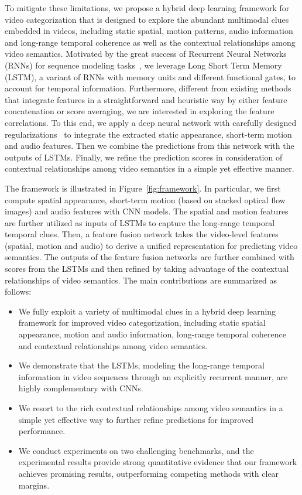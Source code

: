\documentclass[journal]{IEEEtran}
\begin{document}
To mitigate these limitations, we propose a hybrid deep learning framework for video categorization that is designed to explore the abundant multimodal clues embedded in videos, including static spatial, motion patterns, audio information and long-range temporal coherence as well as the contextual relationships among video semantics. Motivated by the great success of Recurrent Neural Networks (RNNs) for sequence modeling tasks~\cite{DBLP:conf/icassp/GravesMH13,graves2005framewise}, we leverage Long Short Term Memory (LSTM), a variant of RNNs with memory units and different functional gates, to account for temporal information. Furthermore, different from existing methods that integrate features in a straightforward and heuristic way by either feature concatenation or score averaging, we are interested in exploring the feature correlations. To this end, we apply a deep neural network with carefully designed regularizations~\cite{TPAMI-fcvid} to integrate the extracted static appearance, short-term motion and audio features. Then we combine the predictions from this network with the outputs of LSTMs. Finally, we refine the prediction scores in consideration of contextual relationships among video semantics in a simple yet effective manner.


The framework is illustrated in Figure~\ref{fig:framework}. In particular, we first compute spatial appearance, short-term motion (based on stacked optical flow images) and audio features with CNN models. The spatial and motion features are further utilized as inputs of LSTMs to capture the long-range temporal temporal clues. Then, a feature fusion network takes the video-level features (spatial, motion and audio) to derive a unified representation for predicting video semantics. The outputs of the feature fusion networks are further combined with scores from the LSTMs and then refined by taking advantage of the contextual relationships of video semantics. The main contributions are summarized as follows:



\begin{itemize}
\item We fully exploit a variety of multimodal clues in a hybrid deep learning framework for improved video categorization, including static spatial appearance, motion and audio information, long-range temporal coherence and contextual relationships among video semantics.
\item We demonstrate that the LSTMs, modeling the long-range temporal information in video sequences through an explicitly recurrent manner, are highly complementary with CNNs.

\item We resort to the rich contextual relationships among video semantics in a simple yet effective way to further refine predictions for improved performance.

\item We conduct experiments on two challenging benchmarks, and the experimental results provide strong quantitative evidence that our framework achieves promising results, outperforming competing methods with clear margins.
\end{itemize}
\end{document}
